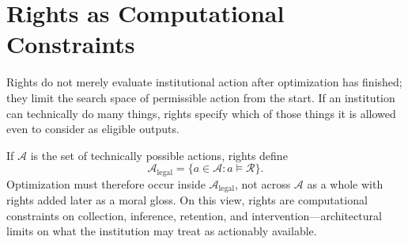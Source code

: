 
\chapter{Rights as Computational Constraints}
\label{ch:ch102}

Rights do not merely evaluate institutional action after optimization has finished; they limit the search space of permissible action from the start. If an institution can technically do many things, rights specify which of those things it is allowed even to consider as eligible outputs.

If \(\mathcal A\) is the set of technically possible actions, rights define
\[
\mathcal A_{\mathrm{legal}}
=
\{a\in\mathcal A:a\models\mathcal R\}.
\]
Optimization must therefore occur inside \(\mathcal A_{\mathrm{legal}}\), not across \(\mathcal A\) as a whole with rights added later as a moral gloss. On this view, rights are computational constraints on collection, inference, retention, and intervention---architectural limits on what the institution may treat as actionably available.
